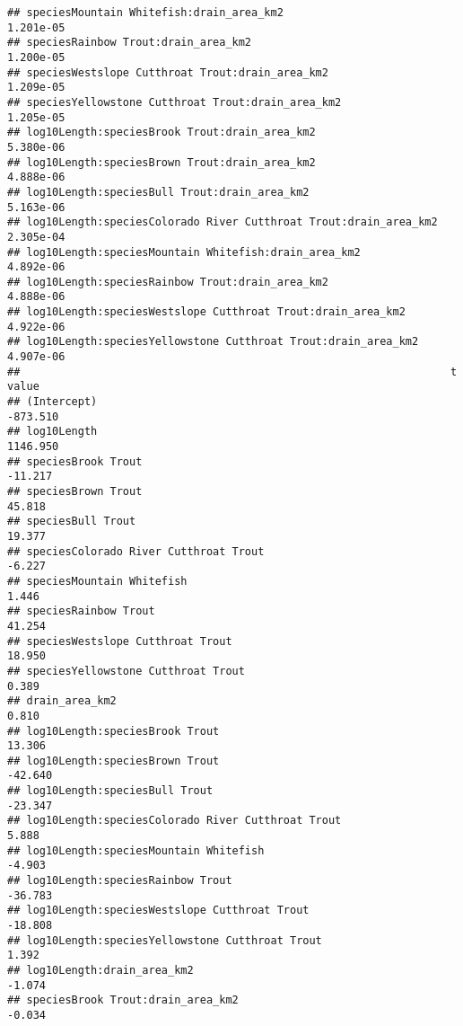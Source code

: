 \documentclass[
  landscape]{article}
\begin{document}
\begin{verbatim}
## speciesMountain Whitefish:drain_area_km2                          1.201e-05
## speciesRainbow Trout:drain_area_km2                               1.200e-05
## speciesWestslope Cutthroat Trout:drain_area_km2                   1.209e-05
## speciesYellowstone Cutthroat Trout:drain_area_km2                 1.205e-05
## log10Length:speciesBrook Trout:drain_area_km2                     5.380e-06
## log10Length:speciesBrown Trout:drain_area_km2                     4.888e-06
## log10Length:speciesBull Trout:drain_area_km2                      5.163e-06
## log10Length:speciesColorado River Cutthroat Trout:drain_area_km2  2.305e-04
## log10Length:speciesMountain Whitefish:drain_area_km2              4.892e-06
## log10Length:speciesRainbow Trout:drain_area_km2                   4.888e-06
## log10Length:speciesWestslope Cutthroat Trout:drain_area_km2       4.922e-06
## log10Length:speciesYellowstone Cutthroat Trout:drain_area_km2     4.907e-06
##                                                                   t value
## (Intercept)                                                      -873.510
## log10Length                                                      1146.950
## speciesBrook Trout                                                -11.217
## speciesBrown Trout                                                 45.818
## speciesBull Trout                                                  19.377
## speciesColorado River Cutthroat Trout                              -6.227
## speciesMountain Whitefish                                           1.446
## speciesRainbow Trout                                               41.254
## speciesWestslope Cutthroat Trout                                   18.950
## speciesYellowstone Cutthroat Trout                                  0.389
## drain_area_km2                                                      0.810
## log10Length:speciesBrook Trout                                     13.306
## log10Length:speciesBrown Trout                                    -42.640
## log10Length:speciesBull Trout                                     -23.347
## log10Length:speciesColorado River Cutthroat Trout                   5.888
## log10Length:speciesMountain Whitefish                              -4.903
## log10Length:speciesRainbow Trout                                  -36.783
## log10Length:speciesWestslope Cutthroat Trout                      -18.808
## log10Length:speciesYellowstone Cutthroat Trout                      1.392
## log10Length:drain_area_km2                                         -1.074
## speciesBrook Trout:drain_area_km2                                  -0.034

\end{verbatim}
\end{document}
